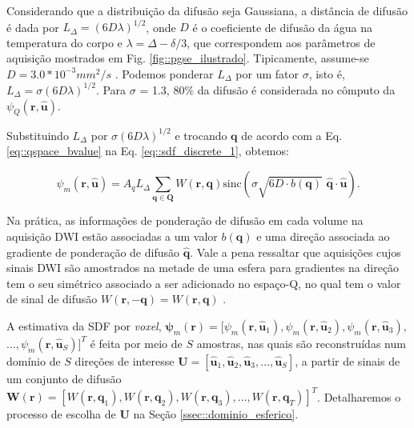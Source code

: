 \documentclass[
    12pt,                %
    oneside,            %
    a4paper,            %
    english,            %
    french,                %
    spanish,            %
    brazil                %
    ]{abntex2}
\begin{document}
Considerando que a distribuição da difusão seja Gaussiana, a distância de difusão é dada por $L_{\Delta}=(6D\lambda)^{1/2}$, onde $D$ é o coeficiente de difusão da água na temperatura do corpo e $\lambda = \Delta - \delta/3$, que correspondem aos parâmetros de aquisição mostrados em Fig. \ref{fig::pgse_ilustrado}. 
Tipicamente, assume-se $D = 3.0*10^{-3} mm^2/s$ \cite{yeh2019_DSI}. Podemos ponderar $L_{\Delta}$ por um fator $\sigma$, isto é, $L_{\Delta} = \sigma(6D\lambda)^{1/2}$. Para $\sigma$ = 1.3, $80\%$ da difusão é considerada no cômputo da $\psi_Q(\mathbf{r}, \mathbf{\hat{u}})$.

Substituindo $L_{\Delta}$ por $\sigma(6D\lambda)^{1/2}$ e trocando $\mathbf{q}$ de acordo com a Eq. \ref{eq::qspace_bvalue} na Eq. \ref{eq::sdf_discrete_1}, obtemos:



\begin{equation}
\label{eq::sdf_discrete_2}
    \psi_m(\mathbf{r}, \mathbf{\hat{u}}) =
    A_qL_{\Delta}\sum_{\mathbf{q} \in \mathbf{Q}}W(\mathbf{r}, \mathbf{q})\text{sinc}(\sigma \sqrt{6D\cdot b(\mathbf{q})}\,\,  \mathbf{\hat{q}}\cdot\mathbf{\hat{u}}) .
\end{equation}

 Na prática, as informações de ponderação de difusão em cada volume na aquisição DWI estão associadas a um valor $b(\mathbf{q})$ e uma direção associada ao gradiente de ponderação de difusão $\mathbf{\hat{q}}$. Vale a pena ressaltar que aquisições cujos sinais DWI são amostrados na metade de uma esfera para gradientes na direção tem o seu simétrico associado a ser adicionado no espaço-Q, no qual tem o valor de sinal de difusão $W(\mathbf{r}, -\mathbf{q}) = W(\mathbf{r}, \mathbf{q})$ \cite{descoteaux2015}.

A estimativa da SDF por \textit{voxel}, 
$\boldsymbol{\psi}_m(\mathbf{r}) = [
\psi_m(\mathbf{r}, \mathbf{\hat{u}}_1), 
\psi_m(\mathbf{r}, \mathbf{\hat{u}}_2), 
\psi_m(\mathbf{r}, \mathbf{\hat{u}}_3),$
$ ..., 
\psi_m(\mathbf{r}, \mathbf{\hat{u}}_S)
]^T$
é feita por meio de $S$ amostras, nas quais são reconstruídas num domínio de $S$ direções de interesse $\mathbf{U} = [
\mathbf{\hat{u}}_1, 
\mathbf{\hat{u}}_2, 
\mathbf{\hat{u}}_3, \dots, 
\mathbf{\hat{u}}_S 
]$, a partir de sinais de um conjunto de difusão $\mathbf{W}(\mathbf{r}) = [
W(\mathbf{r},\mathbf{q}_1),
W(\mathbf{r},\mathbf{q}_2),
W(\mathbf{r},\mathbf{q}_3), \dots ,
W(\mathbf{r},\mathbf{q}_T)
]^T$. Detalharemos o processo de escolha de $\mathbf{U}$ na Seção \ref{ssec::dominio_esferico}.
\end{document}
